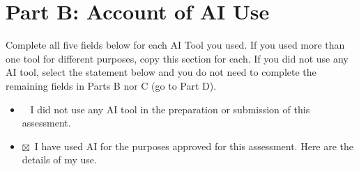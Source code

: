 \documentclass[manuscript,screen,nonacm]{acmart}
\begin{document}
\section*{Part B: Account of AI Use}

\noindent Complete all five fields below for each AI Tool you used. If you used more than one tool for different purposes, copy this section for each. If you did not use any AI tool, select the statement below and you do not need to complete the remaining fields in Parts B nor C (go to Part D).

\begin{itemize}
 \item \noindent\CheckBox[name=declNotUse,bordercolor={0 0 0},width=1.2ex,height=1.2ex]{}~ I did not use any AI tool in the preparation or submission of this assessment.
 \item \noindent\(\boxtimes\)~I have used AI for the purposes approved for this assessment. Here are the details of my use.
\end{itemize}
\end{document}
